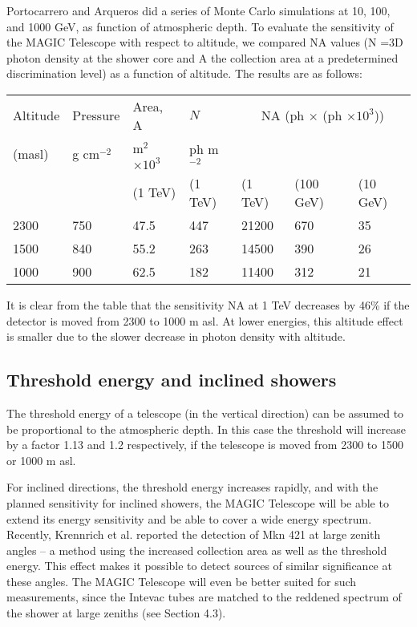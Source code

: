 Portocarrero and Arqueros \cite{arqueros:95} did a series of Monte Carlo simulations at
10, 100, and 1000 GeV, as function of atmospheric depth. To evaluate the
sensitivity of the MAGIC Telescope with respect to altitude, we compared NA values (N =3D
photon density at the shower core and A the collection area at a
predetermined discrimination level) as a function of altitude. The results
are as follows:

\begin{tabular}{|l|l|l|l|l|l|l|}
\hline
Altitude & Pressure & Area, A & $N$ & \multicolumn{3}{|c|}{NA (ph $\times$
(ph $\times 10^3$))} \\ \cline{5-7}
(masl) & g cm$^{-2}$ & m$^2$ $\times 10^3$ & ph m$^{-2}$ &  &  &  \\ 
&  & (1 TeV) & (1 TeV) & (1 TeV) & (100 GeV) & (10 GeV) \\ \hline\hline
2300 & 750 & 47.5 & 447 & 21200 & 670 & 35 \\ \hline
1500 & 840 & 55.2 & 263 & 14500 & 390 & 26 \\ \hline
1000 & 900 & 62.5 & 182 & 11400 & 312 & 21 \\ \hline
\end{tabular}

It is clear from the table that the sensitivity NA at 1 TeV decreases by
46\% if the detector is moved from 2300 to 1000 m asl. At lower energies,
this altitude effect is smaller due to the slower decrease in photon density
with altitude.

\subsection{Threshold energy and inclined showers}


\medskip The threshold energy of a telescope (in the vertical direction) can
be assumed to be proportional to the atmospheric depth. In this case the
threshold will increase by a factor 1.13 and 1.2 respectively, if the
telescope is moved from 2300 to 1500 or 1000 m asl.

For inclined directions, the threshold energy increases rapidly, and with
the planned sensitivity for inclined showers, the MAGIC Telescope will be able to extend
its energy sensitivity and be able to cover a wide energy spectrum.
Recently, Krennrich et al. \cite{krennrich:95} reported the detection of Mkn 421 at large
zenith angles -- a method using the increased collection area as well as the
threshold energy. This effect makes it possible to detect sources of similar
significance at these angles. The MAGIC Telescope will even be better suited for such
measurements, since the Intevac tubes are matched to the reddened spectrum
of the shower at large zeniths (see Section 4.3).

